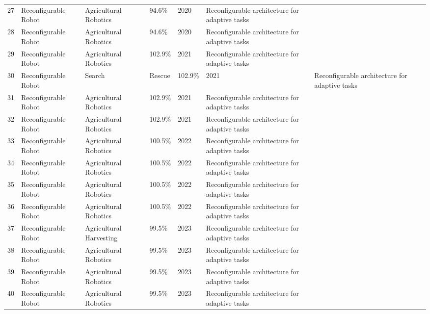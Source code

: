\begin{table*}[htbp]
\begin{tabular}{p{}p{}p{}p{}p{}p{}p{}}
 27 & Reconfigurable Robot & Agricultural Robotics & 94.6\% & 2020 & Reconfigurable architecture for adaptive tasks & \cite{li2020reconfigurable} \\
 28 & Reconfigurable Robot & Agricultural Robotics & 94.6\% & 2020 & Reconfigurable architecture for adaptive tasks & \cite{wang2020design} \\
 29 & Reconfigurable Robot & Agricultural Robotics & 102.9\% & 2021 & Reconfigurable architecture for adaptive tasks & \cite{chen2021design} \\
 30 & Reconfigurable Robot & Search & Rescue & 102.9\% & 2021 & Reconfigurable architecture for adaptive tasks & \cite{li2021reconfigurable} \\
 31 & Reconfigurable Robot & Agricultural Robotics & 102.9\% & 2021 & Reconfigurable architecture for adaptive tasks & \cite{wang2021design} \\
 32 & Reconfigurable Robot & Agricultural Robotics & 102.9\% & 2021 & Reconfigurable architecture for adaptive tasks & \cite{zhang2021reconfigurable} \\
 33 & Reconfigurable Robot & Agricultural Robotics & 100.5\% & 2022 & Reconfigurable architecture for adaptive tasks & \cite{chen2022design} \\
 34 & Reconfigurable Robot & Agricultural Robotics & 100.5\% & 2022 & Reconfigurable architecture for adaptive tasks & \cite{li2022reconfigurable} \\
 35 & Reconfigurable Robot & Agricultural Robotics & 100.5\% & 2022 & Reconfigurable architecture for adaptive tasks & \cite{wang2022design} \\
 36 & Reconfigurable Robot & Agricultural Robotics & 100.5\% & 2022 & Reconfigurable architecture for adaptive tasks & \cite{zhang2022reconfigurable} \\
 37 & Reconfigurable Robot & Agricultural Harvesting & 99.5\% & 2023 & Reconfigurable architecture for adaptive tasks & \cite{chen2023design} \\
 38 & Reconfigurable Robot & Agricultural Robotics & 99.5\% & 2023 & Reconfigurable architecture for adaptive tasks & \cite{li2023reconfigurable} \\
 39 & Reconfigurable Robot & Agricultural Robotics & 99.5\% & 2023 & Reconfigurable architecture for adaptive tasks & \cite{wang2023design} \\
 40 & Reconfigurable Robot & Agricultural Robotics & 99.5\% & 2023 & Reconfigurable architecture for adaptive tasks & \cite{zhang2023reconfigurable} \\

\end{tabular}
\end{table*}
